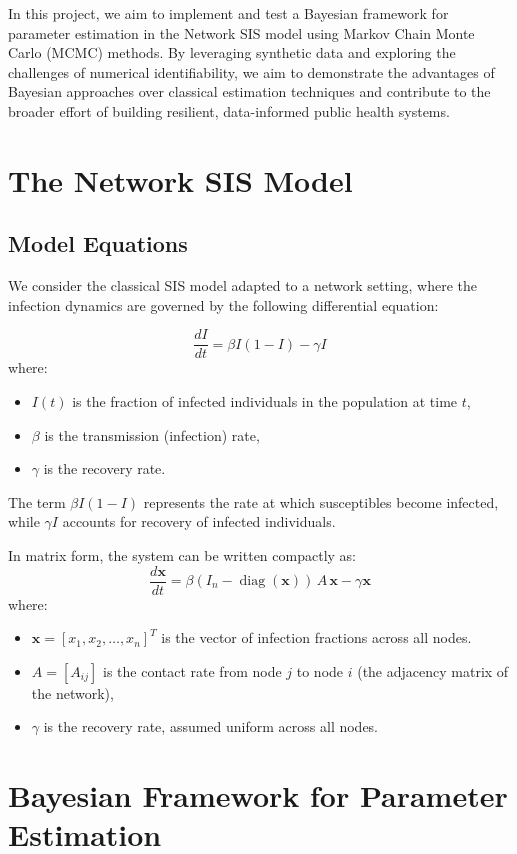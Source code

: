 \documentclass[a4paper,10pt]{report}
\begin{document}
In this project, we aim to implement and test a Bayesian framework for parameter estimation in the Network SIS model using Markov Chain Monte Carlo (MCMC) methods. By leveraging synthetic data and exploring the challenges of numerical identifiability, we aim to demonstrate the advantages of Bayesian approaches over classical estimation techniques and contribute to the broader effort of building resilient, data-informed public health systems.


\section{The Network SIS Model}
\subsection{Model Equations}
We consider the classical SIS model adapted to a network setting, where the infection dynamics are governed by the following differential equation:

\[
\boxed{
\frac{dI}{dt} = \beta I (1 - I) - \gamma I
}
\]
where:
\begin{itemize}
    \item $I(t)$ is the fraction of infected individuals in the population at time $t$,
    \item $\beta$ is the transmission (infection) rate,
    \item $\gamma$ is the recovery rate.
\end{itemize}

The term $\beta I (1 - I)$ represents the rate at which susceptibles become infected, while $\gamma I$ accounts for recovery of infected individuals.



In matrix form, the system can be written compactly as:
\[
\boxed{
\frac{d\mathbf{x}}{dt} = \beta (I_n-\operatorname{diag}(\mathbf{x})) \, A \, \mathbf{x} - \gamma \mathbf{x}
}
\]
where: 
\begin{itemize}
    \item $\mathbf{x} = [x_1, x_2, \dots, x_n]^T$ is the vector of infection fractions across all nodes.
    \item $A = [A_{ij}]$ is the contact rate from node $j$ to node $i$ (the adjacency matrix of the network),
    \item $\gamma$ is the recovery rate, assumed uniform across all nodes.
\end{itemize}


\section{Bayesian Framework for Parameter Estimation}
\end{document}
